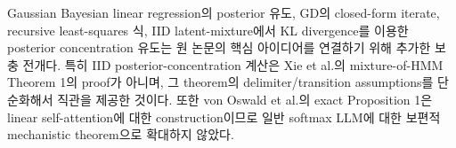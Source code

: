 \documentclass[11pt,a4paper,oneside,openany]{memoir}
\theoremstyle{definition}
\begin{document}
\begin{warningbox}
Gaussian Bayesian linear regression의 posterior 유도, GD의 closed-form iterate, recursive least-squares 식, IID latent-mixture에서 KL divergence를 이용한 posterior concentration 유도는 원 논문의 핵심 아이디어를 연결하기 위해 추가한 보충 전개다. 특히 IID posterior-concentration 계산은 Xie et al.의 mixture-of-HMM Theorem 1의 proof가 아니며, 그 theorem의 delimiter/transition assumptions를 단순화해서 직관을 제공한 것이다. 또한 von Oswald et al.의 exact Proposition 1은 linear self-attention에 대한 construction이므로 일반 softmax LLM에 대한 보편적 mechanistic theorem으로 확대하지 않았다.
\end{warningbox}
\end{document}
